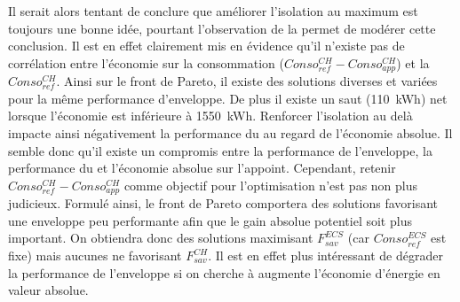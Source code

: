 Il serait alors tentant de conclure que améliorer l’isolation au maximum est
toujours une bonne idée, pourtant l’observation de la  permet
de modérer cette conclusion. Il est en effet clairement mis en évidence
qu’il n’existe pas de corrélation entre l’économie sur la consommation
($Conso_{ref}^{CH} - Conso_{app}^{CH}$) et la $Conso_{ref}^{CH}$. Ainsi sur le front de Pareto,
il existe des solutions diverses
et variées pour la même performance d’enveloppe. De plus il existe un saut (\SI{110}{kWh})
net lorsque l’économie est inférieure à \SI{1550}{kWh}. Renforcer l’isolation
au delà impacte ainsi négativement la performance du  au regard de l’économie
absolue. Il semble donc qu’il existe un compromis entre la performance de l’enveloppe,
la performance du  et l’économie absolue sur l’appoint.
Cependant, retenir $Conso_{ref}^{CH} - Conso_{app}^{CH}$ comme objectif
pour l’optimisation n’est pas non plus judicieux. Formulé ainsi, le front de Pareto
comportera des solutions favorisant une enveloppe peu performante afin que le gain
absolue potentiel soit plus important. On obtiendra donc des solutions
maximisant $F_{sav}^{ECS}$ (car $Conso_{ref}^{ECS}$ est fixe) mais aucunes ne
favorisant $F_{sav}^{CH}$. Il est en effet plus intéressant de dégrader la performance
de l’enveloppe si on cherche à augmente l’économie d’énergie en valeur absolue.

